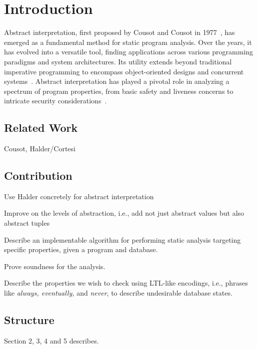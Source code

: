 \section{Introduction}\label{sec:introduction}
Abstract interpretation, first proposed by Cousot and Cousot in 1977~\cite{cousot_abstract_1977}, has emerged as a fundamental method for static program analysis.
Over the years, it has evolved into a versatile tool, finding applications across various programming paradigms and system architectures.
Its utility extends beyond traditional imperative programming to encompass object-oriented designs and concurrent systems~\cite{gustafsson_analyzing_2013, mine_static_2023}.
Abstract interpretation has played a pivotal role in analyzing a spectrum of program properties, from basic safety and liveness concerns to intricate security considerations~\cite{mastroeni_abstract_2011}.

\subsection{Related Work}\label{subsec:related-work}
Cousot, Halder/Cortesi

\subsection{Contribution}\label{subsec:contribution}
Use Halder concretely for abstract interpretation

Improve on the levels of abstraction, i.e., add not just abstract values but also abstract tuples

Describe an implementable algorithm for performing static analysis targeting specific properties, given a program and database.

Prove soundness for the analysis.

Describe the properties we wish to check using LTL-like encodings, i.e., phrases like \emph{always, eventually,} and \emph{never}, to describe undesirable database states.



\subsection{Structure}\label{subsec:structure}
Section 2, 3, 4 and 5 describes.